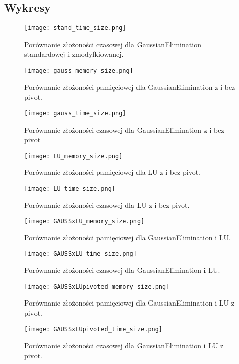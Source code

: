 \documentclass[11pt]{article}
\begin{document}
\begin{flushleft}
\subsection{Wykresy}
\begin{figure}[H]
\centering
  \begin{minipage}[b]{.45\textwidth}
    \centering
    \texttt{[image: stand\_time\_size.png]}
    \caption{Porównanie złożoności czasowej dla GaussianElimination standardowej i zmodyfkiowanej.}
  \end{minipage}
\end{figure}
\centering
\begin{figure}[]
  \begin{minipage}[b]{.45\textwidth}
    \centering
    \texttt{[image: gauss\_memory\_size.png]}
    \caption{Porównanie złożoności pamięciowej dla GaussianElimination z i bez pivot.}
  \end{minipage}\hfill
  \begin{minipage}[b]{.45\textwidth}
    \centering
    \texttt{[image: gauss\_time\_size.png]}
    \caption{Porównanie złożoności czasowej dla GaussianElimination z i bez pivot}
  \end{minipage}
  \begin{minipage}[b]{.45\textwidth}
    \centering
    \texttt{[image: LU\_memory\_size.png]}
    \caption{Porównanie złożoności pamięciowej dla  LU z i bez pivot.}
  \end{minipage}\hfill
  \begin{minipage}[b]{.45\textwidth}
    \centering
    \texttt{[image: LU\_time\_size.png]}
    \caption{Porównanie złożoności czasowej dla  LU z i bez pivot.}
  \end{minipage}
  \begin{minipage}[b]{.45\textwidth}
    \centering
    \texttt{[image: GAUSSxLU\_memory\_size.png]}
    \caption{Porównanie złożoności pamięciowej dla GaussianElimination i LU.}
  \end{minipage}\hfill
  \begin{minipage}[b]{.45\textwidth}
    \centering
    \texttt{[image: GAUSSxLU\_time\_size.png]}
    \caption{Porównanie złożoności czasowej dla GaussianElimination i LU.}
  \end{minipage}
  \end{figure}
\begin{figure}[H]
    \begin{minipage}[b]{.45\textwidth}
    \centering
    \texttt{[image: GAUSSxLUpivoted\_memory\_size.png]}
    \caption{Porównanie złożoności pamięciowej dla GaussianElimination i LU z pivot.}
  \end{minipage}\hfill
  \begin{minipage}[b]{.45\textwidth}
    \centering
    \texttt{[image: GAUSSxLUpivoted\_time\_size.png]}
    \caption{Porównanie złożoności czasowej dla GaussianElimination i LU z pivot.}
  \end{minipage}
\end{figure}
\newpage
\begin{flushleft}

\end{flushleft}
\end{flushleft}
\end{document}
